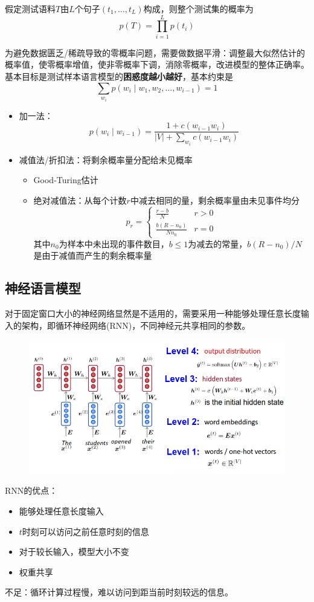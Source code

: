 \begin{definition}
假定测试语料$T$由$L$个句子$(t_1,\ldots,t_L)$构成，则整个测试集的概率为
\[p(T)=\prod_{i=1}^Lp(t_i)\]
\end{definition}

为避免数据匮乏/稀疏导致的零概率问题，需要做数据平滑：调整最大似然估计的概率值，使零概率增值，使非零概率下调，消除零概率，改进模型的整体正确率。
基本目标是测试样本语言模型的\textbf{困惑度越小越好}，基本约束是
\[\sum_{w_i}p(w_i\mid w_1,w_2,\ldots,w_{i-1})=1\]
\begin{itemize}
	\item 加一法：
	\[p(w_i\mid w_{i-1})=\frac{1+c(w_{i-1}w_i)}{|V|+\sum_{w_i}c(w_{i-1}w_i)}\]
	\item 减值法/折扣法：将剩余概率量分配给未见概率
	\begin{itemize}
		\item Good-Turing估计
		\item 绝对减值法：从每个计数$r$中减去相同的量，剩余概率量由未见事件均分
		\[p_r=\begin{cases}
		\frac{r-b}{N} & r>0\\
		\frac{b(R-n_0)}{Nn_0} & r=0
		\end{cases}\]
		其中$n_0$为样本中未出现的事件数目，$b\leq 1$为减去的常量，$b(R-n_0)/N$是由于减值而产生的剩余概率量
	\end{itemize}
\end{itemize}

\subsection{神经语言模型}
对于固定窗口大小的神经网络显然是不适用的，需要采用一种能够处理任意长度输入的架构，即循环神经网络(RNN)，不同神经元共享相同的参数。
\begin{figure}[H]
\centering
\includegraphics[width=0.6\linewidth]{fig/RNN.png}
\end{figure}

RNN的优点：
\begin{itemize}
	\item 能够处理任意长度输入
	\item $t$时刻可以访问之前任意时刻的信息
	\item 对于较长输入，模型大小不变
	\item 权重共享
\end{itemize}

不足：循环计算过程慢，难以访问到距当前时刻较远的信息。